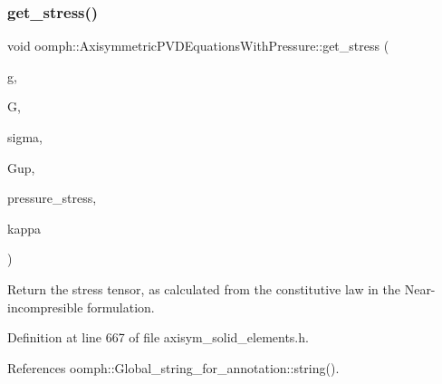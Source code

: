 \subsubsection{\texorpdfstring{get\+\_\+stress()}{get\_stress()}\hspace{0.1cm}{\footnotesize\ttfamily [1/2]}}
{\footnotesize\ttfamily void oomph\+::\+Axisymmetric\+P\+V\+D\+Equations\+With\+Pressure\+::get\+\_\+stress (\begin{DoxyParamCaption}\item[{const \hyperlink{classoomph_1_1DenseMatrix}{Dense\+Matrix}$<$ double $>$ \&}]{g,  }\item[{const \hyperlink{classoomph_1_1DenseMatrix}{Dense\+Matrix}$<$ double $>$ \&}]{G,  }\item[{\hyperlink{classoomph_1_1DenseMatrix}{Dense\+Matrix}$<$ double $>$ \&}]{sigma,  }\item[{\hyperlink{classoomph_1_1DenseMatrix}{Dense\+Matrix}$<$ double $>$ \&}]{Gup,  }\item[{double \&}]{pressure\+\_\+stress,  }\item[{double \&}]{kappa }\end{DoxyParamCaption})\hspace{0.3cm}{\ttfamily [inline]}}



Return the stress tensor, as calculated from the constitutive law in the Near-\/incompresible formulation. 



Definition at line 667 of file axisym\+\_\+solid\+\_\+elements.\+h.



References oomph\+::\+Global\+\_\+string\+\_\+for\+\_\+annotation\+::string().

\mbox{\label{classoomph_1_1AxisymmetricPVDEquationsWithPressure_af9614022b7f3e3fe4ffa9d1de15bfda7}} 
